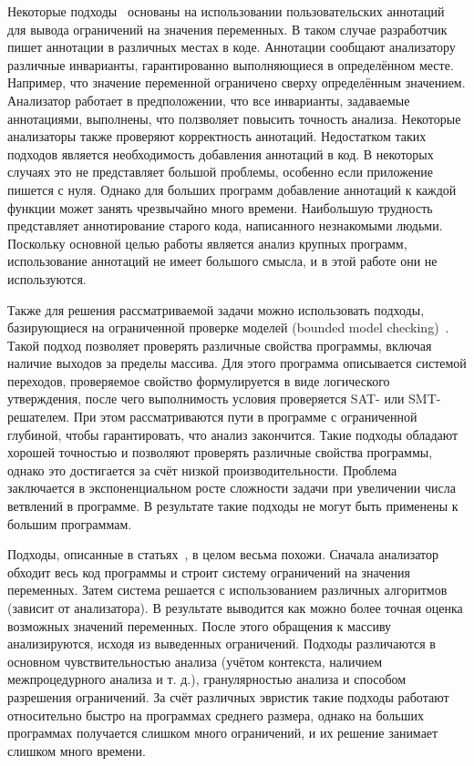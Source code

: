 Некоторые подходы~\cite{larochelle2001statically, hackett2006modular,
  dor2003cssv} основаны на использовании пользовательских аннотаций
для вывода ограничений на значения переменных. В таком случае
разработчик пишет аннотации в различных местах в коде. Аннотации
сообщают анализатору различные инварианты, гарантированно
выполняющиеся в определённом месте. Например, что значение переменной
ограничено сверху определённым значением. Анализатор работает в
предположении, что все инварианты, задаваемые аннотациями, выполнены,
что ползволяет повысить точность анализа. Некоторые анализаторы также
проверяют корректность аннотаций. Недостатком таких подходов
является необходимость добавления аннотаций в код. В некоторых случаях
это не представляет большой проблемы, особенно если приложение пишется
с нуля. Однако для больших программ добавление аннотаций к каждой
функции может занять чрезвычайно много времени. Наибольшую трудность
представляет аннотирование старого кода, написанного незнакомыми
людьми. Поскольку основной целью работы является анализ крупных
программ, использование аннотаций не имеет большого смысла, и в этой
работе они не используются.

Также для решения рассматриваемой задачи можно использовать подходы,
базирующиеся на ограниченной проверке моделей (bounded model
checking)~\cite{cordeiro2012smt, merz2012llbmc}. Такой подход
позволяет проверять различные свойства программы, включая наличие
выходов за пределы массива. Для этого программа описывается системой
переходов, проверяемое свойство формулируется в виде логического
утверждения, после чего выполнимость условия проверяется SAT- или
SMT-решателем. При этом рассматриваются пути в программе с
ограниченной глубиной, чтобы гарантировать, что анализ
закончится. Такие подходы обладают хорошей точностью и позволяют
проверять различные свойства программы, однако это достигается за счёт
низкой производительности. Проблема заключается в экспоненциальном
росте сложности задачи при увеличении числа ветвлений в программе. В
результате такие подходы не могут быть применены к большим программам.

Подходы, описанные в статьях~\cite{wagner2000first,
  ganapathy2003buffer, larochelle2001statically}, в целом весьма
похожи. Сначала анализатор обходит весь код программы и строит систему
ограничений на значения переменных. Затем система решается с
использованием различных алгоритмов (зависит от анализатора). В
результате выводится как можно более точная оценка возможных значений
переменных. После этого обращения к массиву анализируются, исходя из
выведенных ограничений. Подходы различаются в основном
чувствительностью анализа (учётом контекста, наличием межпроцедурного
анализа и т. д.), гранулярностью анализа и способом разрешения
ограничений. За счёт различных эвристик такие подходы работают
относительно быстро на программах среднего размера, однако на больших
программах получается слишком много ограничений, и их решение занимает
слишком много времени.

